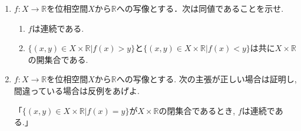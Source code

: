 \documentclass[dvipdfmx,a4paper,11pt]{article}
\newcommand{\R}{\mathbb{R}}
\theoremstyle{definition}
\begin{document}
\begin{enumerate}[ label=\textbf{問}\ref*{sec-product}.\arabic*]

\newpage
\item  $f : X \rightarrow \R$を位相空間$X$から$\R$への写像とする．次は同値であることを示せ.
	\begin{enumerate}
		\setlength{\parskip}{0cm} 
  \setlength{\itemsep}{0pt} 
	\item $f$は連続である.
	\item $\{ (x,y) \in X \times \R | f(x) >y\}$と$\{ (x,y) \in X \times \R | f(x) <y\}$は共に$X \times \R$の開集合である. 
	\end{enumerate}
\item  $f : X \rightarrow \R$を位相空間$X$から$\R$への写像とする. 次の主張が正しい場合は証明し, 間違っている場合は反例をあげよ.

「$\{ (x,y) \in X \times \R | f(x) =y\}$が$X \times \R$の閉集合であるとき, $f$は連続である.」









\end{enumerate}
\end{document}
